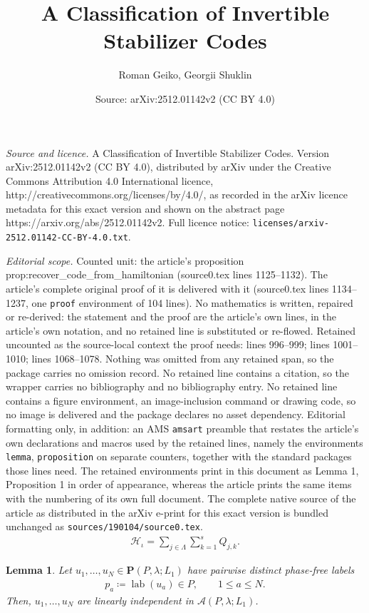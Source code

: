 \documentclass[10pt,a4paper]{amsart}
\title{A Classification of Invertible Stabilizer Codes}
\author{Roman Geiko, Georgii Shuklin}
\date{Source: arXiv:2512.01142v2 (CC BY 4.0)}
\newtheorem{lemma}{Lemma}
\def\CA{{\mathcal A}}
\def\CH {{\mathcal H}}
\def\La{{\Lambda}}
\def\l{{\lambda}}
\def\lab{\operatorname{lab}}
\begin{document}
\maketitle

\noindent\emph{Source and licence.} A Classification of Invertible Stabilizer Codes. Version arXiv:2512.01142v2 (CC BY 4.0), distributed by arXiv under the Creative Commons Attribution 4.0 International licence, http://creativecommons.org/licenses/by/4.0/, as recorded in the arXiv licence metadata for this exact version and shown on the abstract page https://arxiv.org/abs/2512.01142v2. Full licence notice: \texttt{licenses/arxiv-2512.01142-CC-BY-4.0.txt}.\par\smallskip

\noindent\textit{Editorial scope.} Counted unit: the article's proposition prop:recover\_code\_from\_hamiltonian (source0.tex lines 1125--1132). The article's complete original proof of it is delivered with it (source0.tex lines 1134--1237, one \texttt{proof} environment of 104 lines). No mathematics is written, repaired or re-derived: the statement and the proof are the article's own lines, in the article's own notation, and no retained line is substituted or re-flowed.  Retained uncounted as the source-local context the proof needs: lines 996--999; lines 1001--1010; lines 1068--1078.  Nothing was omitted from any retained span, so the package carries no omission record.  No retained line contains a citation, so the wrapper carries no bibliography and no bibliography entry.  No retained line contains a figure environment, an image-inclusion command or drawing code, so no image is delivered and the package declares no asset dependency.  Editorial formatting only, in addition: an AMS \texttt{amsart} preamble that restates the article's own declarations and macros used by the retained lines, namely the environments \texttt{lemma}, \texttt{proposition} on separate counters, together with the standard packages those lines need.  The retained environments print in this document as Lemma 1, Proposition 1 in order of appearance, whereas the article prints the same items with the numbering of its own full document.  The complete native source of the article as distributed in the arXiv e-print for this exact version is bundled unchanged as \texttt{sources/190104/source0.tex}.
\begin{align}\label{eq:stabilizer_hamiltonian}
    \CH_{\iota}
    =\sum_{j\in\La}\sum_{k=1}^{s}Q_{j,k}.
\end{align}

\begin{lemma}\label{lem:linear_independence_quasi_pauli}
Let $u_1,\ldots,u_N\in\textbf{P}(P,\l;L_1)$ have pairwise distinct
phase-free labels
\begin{align*}
    p_a\coloneqq\lab(u_a)\in P,
    \qquad 1\leqslant a\leqslant N.
\end{align*}
Then, $u_1,\ldots,u_N$ are linearly independent in
$\CA(P,\l;L_1)$.
\end{lemma}
\end{document}
